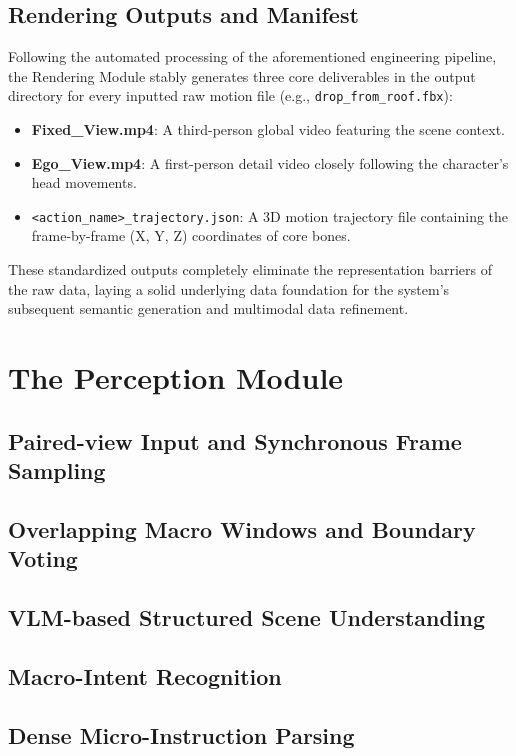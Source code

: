 \documentclass[11pt,oneside]{report}
\begin{document}
\subsection{Rendering Outputs and Manifest}
Following the automated processing of the aforementioned engineering pipeline, the Rendering Module stably generates three core deliverables in the output directory for every inputted raw motion file (e.g., \texttt{drop\_from\_roof.fbx}):

\begin{itemize}
    \item \textbf{Fixed\_View.mp4}: A third-person global video featuring the scene context.
    \item \textbf{Ego\_View.mp4}: A first-person detail video closely following the character's head movements.
    \item \texttt{\textless action\_name\textgreater \_trajectory.json}: A 3D motion trajectory file containing the frame-by-frame (X, Y, Z) coordinates of core bones.
\end{itemize}

These standardized outputs completely eliminate the representation barriers of the raw data, laying a solid underlying data foundation for the system's subsequent semantic generation and multimodal data refinement.

\section{The Perception Module}
\subsection{Paired-view Input and Synchronous Frame Sampling}
\subsection{Overlapping Macro Windows and Boundary Voting}
\subsection{VLM-based Structured Scene Understanding}
\subsection{Macro-Intent Recognition}
\subsection{Dense Micro-Instruction Parsing}
\end{document}
